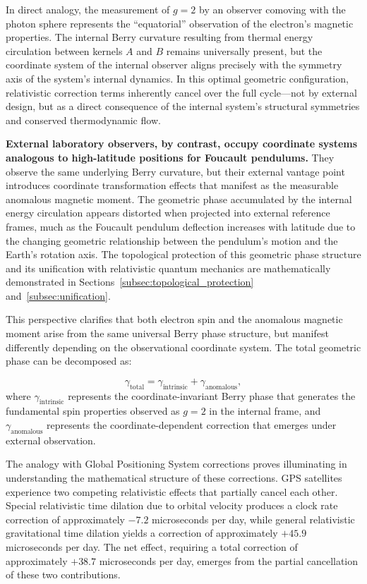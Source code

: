 \documentclass[%
 reprint,
 amsmath,amssymb,
 aps,
]{revtex4-1}
\numberwithin{equation}{section}%
\begin{document}
In direct analogy, the measurement of $g = 2$ by an observer comoving with the photon sphere represents the ``equatorial'' observation of the electron's magnetic properties. The internal Berry curvature resulting from thermal energy circulation between kernels $A$ and $B$ remains universally present, but the coordinate system of the internal observer aligns precisely with the symmetry axis of the system’s internal dynamics. In this optimal geometric configuration, relativistic correction terms inherently cancel over the full cycle---not by external design, but as a direct consequence of the internal system's structural symmetries and conserved thermodynamic flow.

\textbf{External laboratory observers, by contrast, occupy coordinate systems analogous to high-latitude positions for Foucault pendulums.} They observe the same underlying Berry curvature, but their external vantage point introduces coordinate transformation effects that manifest as the measurable anomalous magnetic moment. The geometric phase accumulated by the internal energy circulation appears distorted when projected into external reference frames, much as the Foucault pendulum deflection increases with latitude due to the changing geometric relationship between the pendulum's motion and the Earth's rotation axis. The topological protection of this geometric phase structure and its unification with relativistic quantum mechanics are mathematically demonstrated in Sections~\ref{subsec:topological_protection} and~\ref{subsec:unification}.

This perspective clarifies that both electron spin and the anomalous magnetic moment arise from the same universal Berry phase structure, but manifest differently depending on the observational coordinate system. The total geometric phase can be decomposed as:

\begin{equation}
\gamma_{\text{total}} = \gamma_{\text{intrinsic}} + \gamma_{\text{anomalous}}, \label{eq:phase_decomposition}
\end{equation}
where $\gamma_{\text{intrinsic}}$ represents the coordinate-invariant Berry phase that generates the fundamental spin properties observed as $g = 2$ in the internal frame, and $\gamma_{\text{anomalous}}$ represents the coordinate-dependent correction that emerges under external observation.

The analogy with Global Positioning System corrections proves illuminating in understanding the mathematical structure of these corrections. GPS satellites experience two competing relativistic effects that partially cancel each other. Special relativistic time dilation due to orbital velocity produces a clock rate correction of approximately $-7.2$ microseconds per day, while general relativistic gravitational time dilation yields a correction of approximately $+45.9$ microseconds per day. The net effect, requiring a total correction of approximately $+38.7$ microseconds per day, emerges from the partial cancellation of these two contributions.
\end{document}
